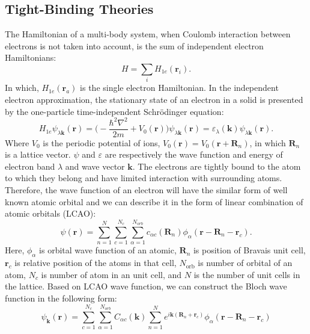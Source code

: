 \documentclass[12pt,english,a4paper]{article}
\begin{document}
	\subsection{Tight-Binding Theories}
\quad The Hamiltonian of a multi-body system, when Coulomb interaction between electrons is not taken into account, is the sum of independent electron Hamiltonians:
	\begin{equation}
		H =\sum_{i} H_{1e} (\textbf{r}_i).
	\end{equation}
\quad In which, $H_{1e} (\textbf{r}_a)$ is the single electron Hamiltonian. In the independent electron approximation, the stationary state of an electron in a solid is presented by the one-particle time-independent Schrödinger equation:
	\begin{equation}
		\label{one-particle time-independent Schrödinger equation}
		H_{1e} \psi_{\lambda\textbf{k}}( \textbf{r}) = \bigg(-\frac{\hbar^2 \nabla^2}{2m} + V_0 (\textbf{r})\bigg) \psi_{\lambda \textbf{k}}(\textbf{r}) = \varepsilon_{\lambda}(\textbf{k})\psi_{\lambda \textbf{k}}(\textbf{r}).
	\end{equation}
\quad Where $V_0$ is the periodic potential of ions, $
V_0(\textbf{r}) = V_0 (\textbf{r}+\textbf{R}_n)$, in which $\textbf{R}_n$ is a lattice vector. $\psi$ and $\varepsilon$ are respectively the wave function and energy of electron band $\lambda$ and wave vector $\textbf{k}$. The electrons are tightly bound to the atom to which they belong and have limited interaction with surrounding atoms. Therefore, the wave function of an electron will have the similar form of well known atomic orbital and we can describe it in the form of linear combination of atomic orbitals (LCAO):
	\begin{equation}
		\psi(\textbf{r}) = \sum_{n=1}^N \sum_{c=1}^{N_c}\sum_{\alpha = 1}^{N_{orb}}c_{\alpha c}(\textbf{R}_n) \phi_\alpha(\textbf{r} -\textbf{R}_n- \textbf{r}_c).
	\end{equation}
\quad Here, $\phi_\alpha$ is orbital wave function of an atomic, $\textbf{R}_n$ is position of Bravais unit cell, $\textbf{r}_c$ is relative position of the atoms in that cell, $N_{\mathrm{orb}}$ is number of orbital of an atom, $N_c$ is number of atom in an unit cell, and $N$ is the number of unit cells in the lattice. Based on LCAO wave function, we can construct the Bloch wave function in the following form:
	\begin{equation}
		\label{Bloch TB}
		\psi_{\textbf{k}} (\textbf{r}) = \sum_{c=1}^{N_c} \sum_{\alpha = 1}^{N_{orb}} C_{\alpha c} (\textbf{k}) \sum_{n=1}^N e^{i\textbf{k}(\textbf{R}_n +\textbf{r}_c)} \phi_{\alpha}(\textbf{r} -\textbf{R}_n -\textbf{r}_c)
	\end{equation}
\end{document}
